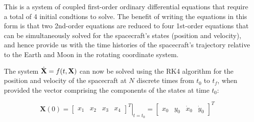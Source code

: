 \vspace{\baselineskip}

This is a system of coupled first-order ordinary differential equations that require a total of 4 initial condtions to solve. The benefit of writing the equations in this form is that \color{magenta} two 2nd-order equations are reduced to four 1st-order equations \color{white} that can be simultaneously solved for the spacecraft's states (position and velocity), and hence provide us with the time histories of the spacecraft's trajectory relative to the Earth and Moon in the rotating coordinate system.

\vspace{\baselineskip}

The system $\dot{\bf{X}} = f(t,\bf{X})$ can now be solved using the RK4 algorithm for the position and velocity of the spacecraft at $N$ discrete times from $t_0$ to $t_f$, when provided the vector comprising the components of the states at time $t_0$:

\begin{equation*}
    \textbf{X}(0) =
    \left.\begin{bmatrix}
        x_1 & x_2 & x_3 & x_4
    \end{bmatrix}^T\right|_{t=t_0}
    =
    \begin{bmatrix}
        x_0 & y_0 & \dot{x}_0 & \dot{y}_0
    \end{bmatrix}^T
\end{equation*}